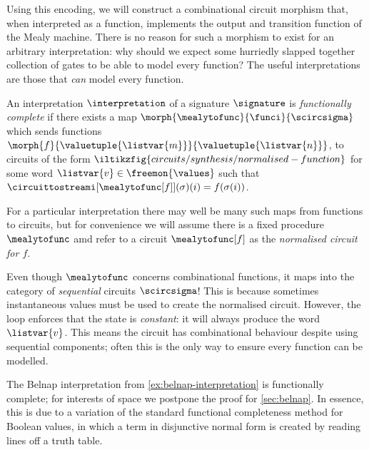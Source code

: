 Using this encoding, we will construct a combinational circuit morphism that,
when interpreted as a function, implements the output and transition function
of the Mealy machine.
There is no reason for such a morphism to exist for an arbitrary interpretation:
why should we expect some hurriedly slapped together collection of gates to be
able to model every function?
The useful interpretations are those that \emph{can} model every function.

\begin{definition}\label{def:functional-completeness}
    An interpretation \(\interpretation\) of a signature \(\signature\) is
    \emph{functionally complete} if there exists a map \(
    \morph{\mealytofunc}{\funci}{\scircsigma}
    \) which sends functions \(
    \morph{f}{\valuetuple{\listvar{m}}}{\valuetuple{\listvar{n}}}
    \), to circuits of the form \(
    \iltikzfig{circuits/synthesis/normalised-function}
    \) for some word \(\listvar{v} \in \freemon{\values}\) such that
    \(\circuittostreami[\mealytofunc[f]](\sigma)(i) = f(\sigma(i))\).
\end{definition}

For a particular interpretation there may well be many such maps from functions
to circuits, but for convenience we will assume there is a fixed procedure
\(\mealytofunc\) amd refer to a circuit \(\mealytofunc[f]\) as the
\emph{normalised circuit for \(f\)}.\

\begin{remark}
    Even though \(\mealytofunc\) concerns combinational functions, it maps into
    the category of \emph{sequential} circuits \(\scircsigma\)!
    This is because sometimes instantaneous values must be used to create the
    normalised circuit.
    However, the loop enforces that the state is \emph{constant}: it will always
    produce the word \(\listvar{v}\).
    This means the circuit has combinational behaviour despite using sequential
    components; often this is the only way to ensure every function can be
    modelled.
\end{remark}

\begin{example}
    The Belnap interpretation from \cref{ex:belnap-interpretation} is
    functionally complete; for interests of space we postpone the proof for
    \cref{sec:belnap}.
    In essence, this is due to a variation of the standard functional
    completeness method for Boolean values, in which a term in disjunctive
    normal form is created by reading lines off a truth table.
\end{example}

